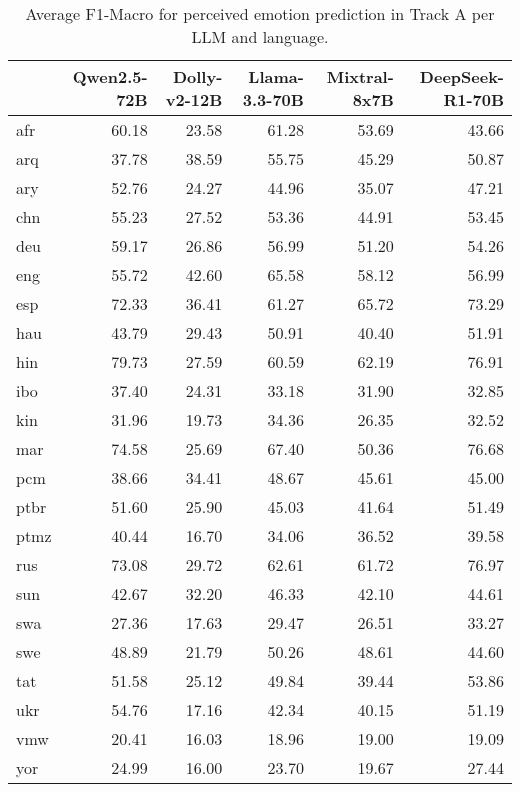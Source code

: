 \begin{table*}
\begin{tabular}{lrrrrr}
\toprule
 & Qwen2.5-72B & Dolly-v2-12B & Llama-3.3-70B & Mixtral-8x7B & DeepSeek-R1-70B \\
\midrule
afr & 60.18 & 23.58 & 61.28 & 53.69 & 43.66 \\
arq & 37.78 & 38.59 & 55.75 & 45.29 & 50.87 \\
ary & 52.76 & 24.27 & 44.96 & 35.07 & 47.21 \\
chn & 55.23 & 27.52 & 53.36 & 44.91 & 53.45 \\
deu & 59.17 & 26.86 & 56.99 & 51.20 & 54.26 \\
eng & 55.72 & 42.60 & 65.58 & 58.12 & 56.99 \\
esp & 72.33 & 36.41 & 61.27 & 65.72 & 73.29 \\
hau & 43.79 & 29.43 & 50.91 & 40.40 & 51.91 \\
hin & 79.73 & 27.59 & 60.59 & 62.19 & 76.91 \\
ibo & 37.40 & 24.31 & 33.18 & 31.90 & 32.85 \\
kin & 31.96 & 19.73 & 34.36 & 26.35 & 32.52 \\
mar & 74.58 & 25.69 & 67.40 & 50.36 & 76.68 \\
pcm & 38.66 & 34.41 & 48.67 & 45.61 & 45.00 \\
ptbr & 51.60 & 25.90 & 45.03 & 41.64 & 51.49 \\
ptmz & 40.44 & 16.70 & 34.06 & 36.52 & 39.58 \\
rus & 73.08 & 29.72 & 62.61 & 61.72 & 76.97 \\
sun & 42.67 & 32.20 & 46.33 & 42.10 & 44.61 \\
swa & 27.36 & 17.63 & 29.47 & 26.51 & 33.27 \\
swe & 48.89 & 21.79 & 50.26 & 48.61 & 44.60 \\
tat & 51.58 & 25.12 & 49.84 & 39.44 & 53.86 \\
ukr & 54.76 & 17.16 & 42.34 & 40.15 & 51.19 \\
vmw & 20.41 & 16.03 & 18.96 & 19.00 & 19.09 \\
yor & 24.99 & 16.00 & 23.70 & 19.67 & 27.44 \\
\bottomrule
\end{tabular}
\caption{Average F1-Macro for perceived emotion prediction in Track A per LLM and language.}
\end{table*}